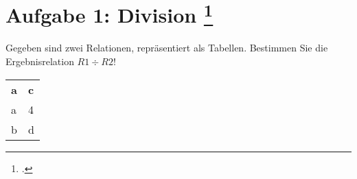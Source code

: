 \documentclass{lehramt-informatik-aufgabe}
\begin{document}

\section{Aufgabe 1: Division
\footcite{db:ab:4}}

Gegeben sind zwei Relationen, repräsentiert als Tabellen. Bestimmen Sie
die Ergebnisrelation $R1 \div R2$!

\begin{liAntwort}
\begin{tabular}{ll}
\textbf{a} & \textbf{c} \\
a & 4 \\
b & d
\end{tabular}
\end{liAntwort}
\end{document}
